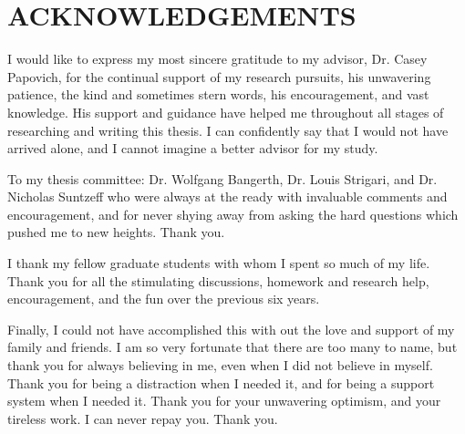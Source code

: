 %
%
%


\chapter*{ACKNOWLEDGEMENTS}


\indent 
I would like to express my most sincere gratitude to my advisor, Dr. Casey Papovich, for the continual support of my research pursuits, his unwavering patience, the kind and sometimes stern words, his encouragement, and vast knowledge. His support and guidance have helped me throughout all stages of researching and writing this thesis. I can confidently say that I would not have arrived alone, and I cannot imagine a better advisor for my study.

To my thesis committee: Dr. Wolfgang Bangerth, Dr. Louis Strigari, and Dr. Nicholas Suntzeff who were always at the ready with invaluable comments and encouragement, and for never shying away from asking the hard questions which pushed me to new heights. Thank you.

I thank my fellow graduate students with whom I spent so much of my life. Thank you for all the stimulating discussions, homework and research help, encouragement, and the fun over the previous six years.

Finally, I could not have accomplished this with out the love and support of my family and friends. I am so very fortunate that there are too many to name, but thank you for always believing in me, even when I did not believe in myself. Thank you for being a distraction when I needed it, and for being a support system when I needed it. Thank you for your unwavering optimism, and your tireless work. I can never repay you. Thank you.
\pagebreak{}